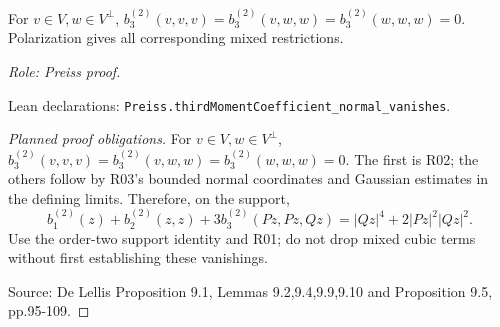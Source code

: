\begin{lemma}
\label{lem:rigidity-cubic-vanishing}






For $v\in V,w\in V^\perp$, $b_3^{(2)}(v,v,v)=b_3^{(2)}(v,w,w)=b_3^{(2)}(w,w,w)=0$. Polarization gives all corresponding mixed restrictions.
\par\emph{Role: Preiss proof.}
\par Lean declarations: \texttt{Preiss.thirdMomentCoefficient\_normal\_vanishes}.
\end{lemma}
\begin{proof}[Planned proof obligations]

For $v\in V,w\in V^\perp$,
$b_3^{(2)}(v,v,v)=b_3^{(2)}(v,w,w)=b_3^{(2)}(w,w,w)=0$.
The first is R02; the others follow by R03's bounded normal coordinates and
Gaussian estimates in the defining limits. Therefore, on the support,
\[
 b_1^{(2)}(z)+b_2^{(2)}(z,z)+3b_3^{(2)}(Pz,Pz,Qz)
 =|Qz|^4+2|Pz|^2|Qz|^2.
\]
Use the order-two support identity and R01; do not drop mixed cubic terms
without first establishing these vanishings.
\par Source: De Lellis Proposition 9.1, Lemmas 9.2,9.4,9.9,9.10 and Proposition 9.5, pp.95-109.
\end{proof}

